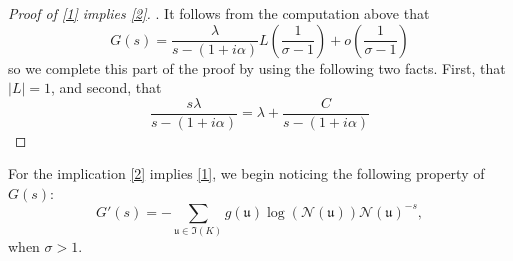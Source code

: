 \documentclass[11pt]{amsart}
\theoremstyle{definition}
\newcommand{\NN}{{\mathcal N}}
\newcommand{\mf}{\mathfrak}
\begin{document}
\begin{proof}[Proof of \eqref{1} implies \eqref{2}]
 . It follows from the computation above that
 \[
  G(s)=\frac{\lambda}{s-(1+i\alpha)} L\left(\frac{1}{\sigma-1}\right) +o\left(\frac{1}{\sigma-1}\right)
 \]
 so we complete this part of the proof by using the following two facts. First, that $|L|=1$, and second, that
 \[
 \frac{s\lambda}{s-(1+i\alpha)} = \lambda+\frac{C}{s-(1+i\alpha)}
 \]
\fi
  \end{proof}
For the implication \eqref{2} implies \eqref{1}, we begin noticing the following property of $G(s)$:
 $$G'(s)=-\sum_{\mf u\in\mf I (K)}g(\mf u)\log(\NN(\mf u))\NN(\mf u)^{-s},$$
when $\sigma>1$.
\end{document}
